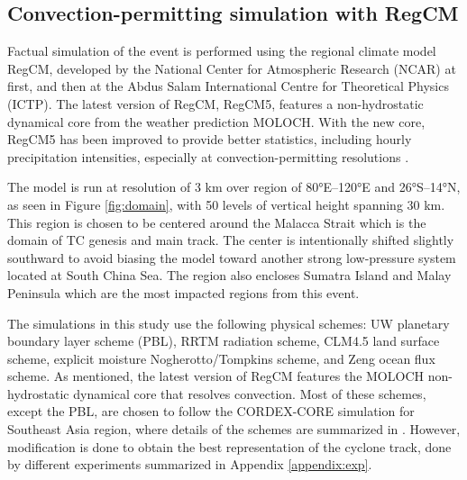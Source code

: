 \documentclass[journal abbreviation, manuscript]{copernicus}
\begin{document}
\subsection{Convection-permitting simulation with RegCM}
\label{section:cpm_with_regcm}

Factual simulation of the event is performed using the regional climate model RegCM, developed by the National Center for Atmospheric Research (NCAR) at first, and then at the Abdus Salam International Centre for Theoretical Physics (ICTP). The latest version of RegCM, RegCM5, features a non-hydrostatic dynamical core from the weather prediction MOLOCH. With the new core, RegCM5 has been improved to provide better statistics, including hourly precipitation intensities, especially at convection-permitting resolutions \citep{giorgi2023fifth, coppola20255th}. %

The model is run at resolution of 3 km over region of 80°E--120°E and 26°S--14°N, as seen in Figure \ref{fig:domain}, with 50 levels of vertical height spanning 30 km. This region is chosen to be centered around the Malacca Strait which is the domain of TC genesis and main track. The center is intentionally shifted slightly southward to avoid biasing the model toward another strong low-pressure system located at South China Sea. The region also encloses Sumatra Island and Malay Peninsula which are the most impacted regions from this event.

The simulations in this study use the following physical schemes: UW planetary boundary layer scheme (PBL), RRTM radiation scheme, CLM4.5 land surface scheme, explicit moisture Nogherotto/Tompkins scheme, and Zeng ocean flux scheme. As mentioned, the latest version of RegCM features the MOLOCH non-hydrostatic dynamical core that resolves convection. Most of these schemes, except the PBL, are chosen to follow the CORDEX-CORE simulation for Southeast Asia region, where details of the schemes are summarized in \citet{coppola20255th}. However, modification is done to obtain the best representation of the cyclone track, done by different experiments summarized in Appendix \ref{appendix:exp}.
\end{document}
